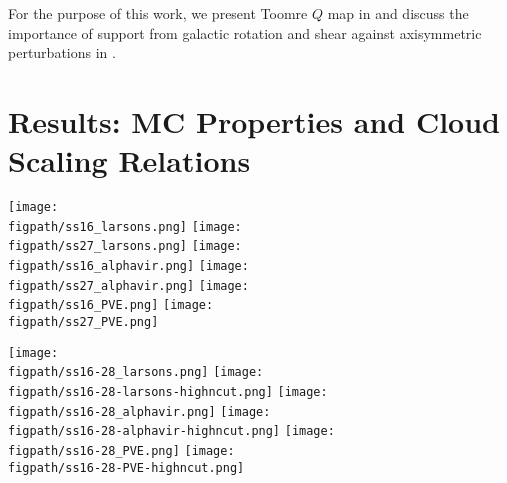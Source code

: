 \IfFileExists{emulateapjlegacy.cls}{\documentclass[iop]{emulateapjlegacy}}{\documentclass[iop]{emulateapj}}
\newcommand{\AP}[1]{({\bf \color{apcolor} AP: #1})}
\def\figpath{./Fig}
\begin{document}
For the purpose of this work, we present Toomre $Q$ map in  and discuss the importance of support from galactic rotation and shear against axisymmetric perturbations in .

\section{Results: MC Properties and Cloud Scaling Relations}\label{sec:results}

\begin{figure*}
\centering
\texttt{[image: \\figpath/ss16\_larsons.png]}
\texttt{[image: \\figpath/ss27\_larsons.png]}
\texttt{[image: \\figpath/ss16\_alphavir.png]}
\texttt{[image: \\figpath/ss27\_alphavir.png]}
\texttt{[image: \\figpath/ss16\_PVE.png]}
\texttt{[image: \\figpath/ss27\_PVE.png]}
\caption{
\AP{different cuts, 2 selected evolutionary stages (left/right); I have not found a good clipping for the upper left panel} \AP{If you like the current arrangement please 1) increase a bit the size of the labels 2) put the legend only the right panels 3) add a text label to the upper left corner, to ditinguish between accreting and starburst stage 4) I would use a perceptually increasing colorbar to indicate the different cuts 5) legend for the cuts can be substituted by a colorbar axis to be shown as an inset in 1 of the panels or as a separate figure below the panels}
\label{fig:alpha16-28}}
\end{figure*}

\begin{figure*}
\centering
\texttt{[image: \\figpath/ss16-28\_larsons.png]}
\texttt{[image: \\figpath/ss16-28-larsons-highncut.png]}
\texttt{[image: \\figpath/ss16-28\_alphavir.png]}
\texttt{[image: \\figpath/ss16-28-alphavir-highncut.png]}
\texttt{[image: \\figpath/ss16-28\_PVE.png]}
\texttt{[image: \\figpath/ss16-28-PVE-highncut.png]}
\caption{
\AP{evolutionary stage (function of sfr), different cuts (left/right)}\AP{similarly to the previous figure for different cuts; we might visually distinguish the points different color codes for the SFR and $n_{cut}$}
\label{fig:alpha16-28}}
\end{figure*}
\end{document}
